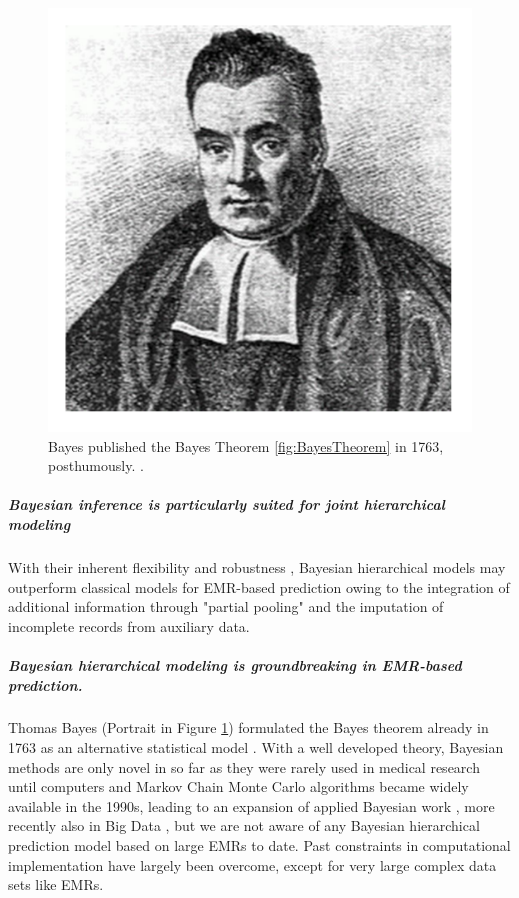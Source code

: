 \documentclass[11pt,notitlepage]{article}
\begin{document}
\begin{figure} %
 \vspace{-10pt}
 \includegraphics[scale=0.13]{Figures/Thomas_Bayes.pdf} 
  \vspace{-30pt}
 \caption{\footnotesize Bayes published the Bayes Theorem \ref{fig:BayesTheorem} in 1763, posthumously. \cite{Thomas_Bayes}.}
 \vspace{-20pt}
 \label{fig:Bayes}
\end{figure} 

\subparagraph*{Bayesian inference is particularly suited for joint hierarchical modeling}
With their inherent flexibility and robustness \cite{Carlin_1349763,Sutton_2012}, Bayesian hierarchical models may outperform classical models for EMR-based prediction owing to the integration of additional information through "partial pooling" \cite{Gelman_red_2009} and the imputation of incomplete records from auxiliary data. 

\subparagraph*{Bayesian hierarchical modeling is groundbreaking in EMR-based prediction.}
Thomas Bayes (Portrait in Figure \ref{fig:Bayes}) formulated the Bayes theorem already in 1763 as an alternative statistical model \cite{Thomas_Bayes}. With a well developed theory, Bayesian methods are only novel in so far as they were rarely used in medical research until computers and Markov Chain Monte Carlo algorithms became widely available in the 1990s, leading to an expansion of applied Bayesian work \cite{Ashby_16947924,Spiegelhalter_11134920}, more recently also in Big Data \cite{Yoo_24987556}, but we are not aware of any Bayesian hierarchical prediction model based on large EMRs to date. Past constraints in computational implementation have largely been overcome, except for very large complex data sets like EMRs. 
\end{document}
